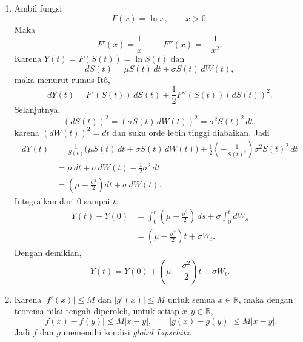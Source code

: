\documentclass[11pt,a4paper]{article}
\newcommand{\E}{\mathbb{E}}
\newcommand{\R}{\mathbb{R}}
\newcommand{\F}{\mathcal{F}}
\begin{document}
\begin{enumerate}[leftmargin=*, itemsep=0.6cm]
\begin{enumerate}[label=\alph*)]
          \item Ya, $(M_t)_{t\ge 0}$ adalah martingale terhadap filtrasi
                $(\F_t)_{t\ge 0}$, sebab:
                \begin{enumerate}[label=\roman*)]
                  \item $M_t$ adalah $\F_t$-terukur karena merupakan fungsi dari $W_t$,
                  \item $M_t$ terintegralkan karena $\E|M_t|=\E[M_t]=1<\infty$,
                  \item dari butir (b) berlaku $\E(M_t\mid\F_s)=M_s$ untuk setiap $0\le s<t$.
                \end{enumerate}
                Jadi definisi martingale terpenuhi.
        \end{enumerate}

  \item Ambil fungsi
        \[
          F(x)=\ln x,\qquad x>0.
        \]
        Maka
        \[
          F'(x)=\frac{1}{x},\qquad F''(x)=-\frac{1}{x^2}.
        \]
        Karena $Y(t)=F(S(t))=\ln S(t)$ dan
        \[
          dS(t)=\mu S(t)\,dt+\sigma S(t)\,dW(t),
        \]
        maka menurut rumus It\^o,
        \[
          dY(t)=F'(S(t))\,dS(t)+\frac{1}{2}F''(S(t))(dS(t))^2.
        \]
        Selanjutnya,
        \[
          (dS(t))^2=(\sigma S(t)\,dW(t))^2=\sigma^2 S(t)^2\,dt,
        \]
        karena $(dW(t))^2=dt$ dan suku orde lebih tinggi diabaikan. Jadi
        \begin{align*}
          dY(t)
           & =\frac{1}{S(t)}\bigl(\mu S(t)\,dt+\sigma S(t)\,dW(t)\bigr)
          +\frac{1}{2}\left(-\frac{1}{S(t)^2}\right)\sigma^2 S(t)^2\,dt\\
           & =\mu\,dt+\sigma\,dW(t)-\frac{1}{2}\sigma^2\,dt\\
           & =\left(\mu-\frac{\sigma^2}{2}\right)dt+\sigma\,dW(t).
        \end{align*}
        Integralkan dari $0$ sampai $t$:
        \begin{align*}
          Y(t)-Y(0)
           & =\int_0^t \left(\mu-\frac{\sigma^2}{2}\right)\,ds
          +\sigma\int_0^t dW_s\\
           & =\left(\mu-\frac{\sigma^2}{2}\right)t+\sigma W_t.
        \end{align*}
        Dengan demikian,
        \[
          Y(t)=Y(0)+\left(\mu-\frac{\sigma^2}{2}\right)t+\sigma W_t.
        \]

  \item Karena $|f'(x)|\le M$ dan $|g'(x)|\le M$ untuk semua $x\in\R$, maka dengan teorema
        nilai tengah diperoleh, untuk setiap $x,y\in\R$,
        \[
          |f(x)-f(y)|\le M|x-y|,
          \qquad
          |g(x)-g(y)|\le M|x-y|.
        \]
        Jadi $f$ dan $g$ memenuhi kondisi \textit{global Lipschitz}.


\end{enumerate}
\end{document}
